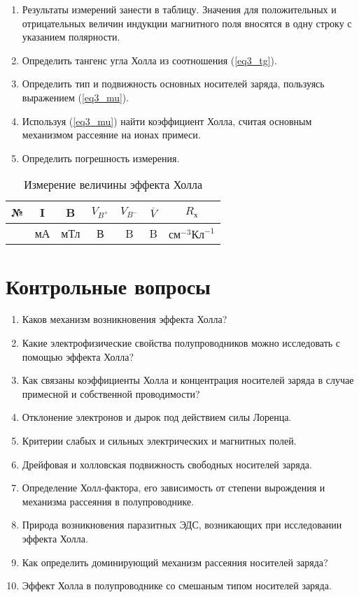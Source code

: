 \begin{enumerate}
\item Результаты измерений занести в таблицу. Значения для положительных и отрицательных величин индукции магнитного поля вносятся в одну строку с указанием полярности.
\item Определить тангенс угла Холла из соотношения (\ref{eq3_tg}).
\item Определить тип и подвижность основных носителей заряда, пользуясь выражением (\ref{eq3_mu}).
\item Используя (\ref{eq3_mu}) найти коэффициент Холла, считая основным механизмом рассеяние на ионах примеси.
\item Определить погрешность измерения.
\end{enumerate}

\begin{table}[h!]
\caption{Измерение величины эффекта Холла}
\begin{center}
\begin{tabular}{c|c|c|c|c|c|c}
№ & I & B & $V_{B^{+}}$ & $V_{B^{-}}$ & $\overline{V}$ & $R_{\text{х}}$ \\
\hline
& мА & мТл & В & B & B & $\text{см}^{-3}\text{Кл}^{-1}$ \\
\hline
\end{tabular}
\end{center}
\end{table}

\section{Контрольные вопросы}

\begin{enumerate}
\item Каков механизм возникновения эффекта Холла?
\item Какие электрофизические свойства полупроводников можно исследовать с помощью эффекта Холла?
\item Как связаны коэффициенты Холла и концентрация носителей заряда в случае примесной и собственной проводимости?
\item Отклонение электронов и дырок под действием силы Лоренца.
\item Критерии слабых и сильных электрических и магнитных полей.
\item Дрейфовая и холловская подвижность свободных носителей заряда.
\item Определение Холл-фактора, его зависимость от степени вырождения и механизма рассеяния в полупроводнике.
\item Природа возникновения паразитных ЭДС, возникающих при исследовании эффекта Холла.
\item Как определить доминирующий механизм рассеяния носителей заряда?
\item Эффект Холла в полупроводнике со смешаным типом носителей заряда.
\end{enumerate}

